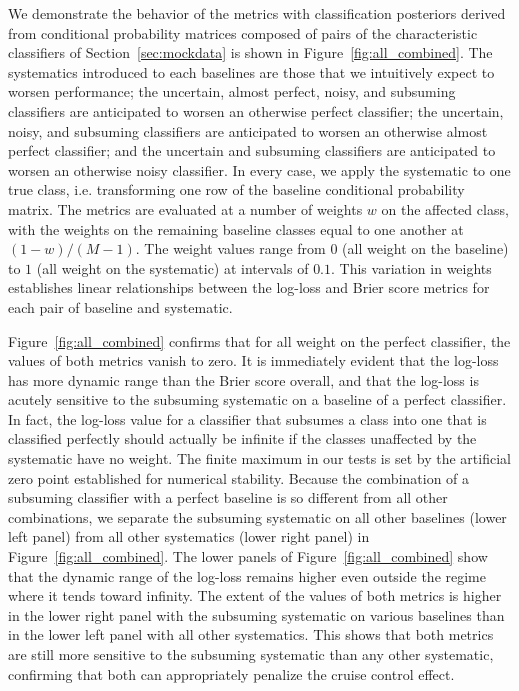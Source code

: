We demonstrate the behavior of the metrics with classification posteriors derived from conditional probability matrices composed of pairs of the characteristic classifiers of Section~\ref{sec:mockdata} is shown in Figure~\ref{fig:all_combined}.
The systematics introduced to each baselines are those that we intuitively expect to worsen performance;
the uncertain, almost perfect, noisy, and subsuming classifiers are anticipated to worsen an otherwise perfect classifier;
the uncertain, noisy, and subsuming classifiers are anticipated to worsen an otherwise almost perfect classifier;
and the uncertain and subsuming classifiers are anticipated to worsen an otherwise noisy classifier.
In every case, we apply the systematic to one true class, i.e. transforming one row of the baseline conditional probability matrix.
The metrics are evaluated at a number of weights $w$ on the affected class, with the weights on the remaining baseline classes equal to one another at $(1 - w) / (M - 1)$.
The weight values range from $0$ (all weight on the baseline) to $1$ (all weight on the systematic) at intervals of $0.1$.
This variation in weights establishes linear relationships between the log-loss and Brier score metrics for each pair of baseline and systematic.

Figure~\ref{fig:all_combined} confirms that for all weight on the perfect classifier, the values of both metrics vanish to zero.
It is immediately evident that the log-loss has more dynamic range than the Brier score overall, and that the log-loss is acutely sensitive to the subsuming systematic on a baseline of a perfect classifier.
In fact, the log-loss value for a classifier that subsumes a class into one that is classified perfectly should actually be infinite if the classes unaffected by the systematic have no weight.
The finite maximum in our tests is set by the artificial zero point established for numerical stability.
Because the combination of a subsuming classifier with a perfect baseline is so different from all other combinations, we separate the subsuming systematic on all other baselines (lower left panel) from all other systematics (lower right panel) in Figure~\ref{fig:all_combined}.
The lower panels of Figure~\ref{fig:all_combined} show that the dynamic range of the log-loss remains higher even outside the regime where it tends toward infinity.
The extent of the values of both metrics is higher in the lower right panel with the subsuming systematic on various baselines than in the lower left panel with all other systematics.
This shows that both metrics are still more sensitive to the subsuming systematic than any other systematic, confirming that both can appropriately penalize the cruise control effect.

